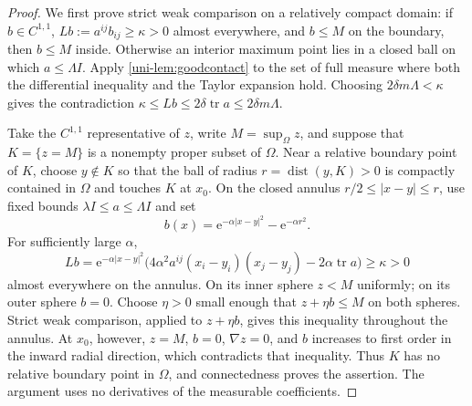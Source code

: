 \begin{proof}
We first prove strict weak comparison on a relatively compact domain:
if $b\in C^{1,1}$, $Lb:=a^{ij}b_{ij}\geq\kappa>0$ almost everywhere,
and $b\leq M$ on the boundary, then $b\leq M$ inside.  Otherwise an
interior maximum point lies in a closed ball on which
$a\leq\Lambda I$.  Apply \cref{uni-lem:goodcontact} to the set of full measure
where both the differential inequality and the Taylor expansion hold.
Choosing $2\delta m\Lambda<\kappa$ gives the contradiction
$\kappa\leq Lb\leq2\delta\operatorname{tr}a\leq2\delta m\Lambda$.

Take the $C^{1,1}$ representative of $z$, write $M=\sup_\Omega z$,
and suppose that $K=\{z=M\}$ is a nonempty proper subset of $\Omega$.  Near a relative boundary
point of $K$, choose $y\notin K$ so that the ball of radius
$r=\operatorname{dist}(y,K)>0$ is compactly contained in $\Omega$ and
touches $K$ at $x_0$.  On the closed annulus
$r/2\leq|x-y|\leq r$, use fixed bounds $\lambda I\leq a\leq\Lambda I$
and set
\[
 b(x)=\mathrm{e}^{-\alpha|x-y|^2}-\mathrm{e}^{-\alpha r^2}.
\]
For sufficiently large $\alpha$,
\[
 Lb=\mathrm{e}^{-\alpha|x-y|^2}
       \bigl(4\alpha^2 a^{ij}(x_i-y_i)(x_j-y_j)
                       -2\alpha\operatorname{tr}a\bigr)\geq\kappa>0
\]
almost everywhere on the annulus.  On its inner sphere $z<M$ uniformly;
on its outer sphere $b=0$.  Choose $\eta>0$ small enough that
$z+\eta b\leq M$ on both spheres.  Strict weak comparison, applied to $z+\eta b$, gives this
inequality throughout the annulus.  At $x_0$, however, $z=M$, $b=0$, $\nabla z=0$,
and $b$ increases to first order in the inward radial direction, which
contradicts that inequality.  Thus $K$ has no relative boundary point in $\Omega$, and
connectedness proves the assertion.  The argument uses no derivatives of
the measurable coefficients.
\end{proof}

